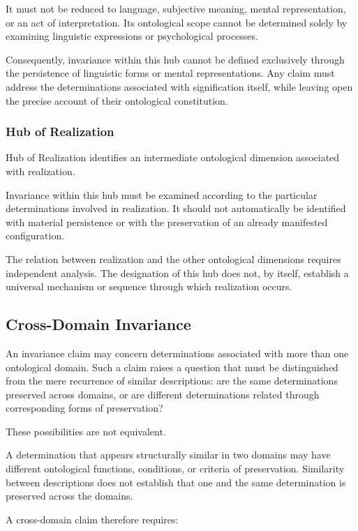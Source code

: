 It must not be reduced to language,
subjective meaning, mental representation,
or an act of interpretation. Its ontological
scope cannot be determined solely by
examining linguistic expressions or
psychological processes.

Consequently, invariance within this hub
cannot be defined exclusively through
the persistence of linguistic forms or
mental representations. Any claim must
address the determinations associated
with signification itself, while leaving
open the precise account of their
ontological constitution.

\subsubsection{Hub of Realization}

Hub of Realization identifies an intermediate
ontological dimension associated with
realization.

Invariance within this hub must be examined
according to the particular determinations
involved in realization. It should not
automatically be identified with material
persistence or with the preservation of
an already manifested configuration.

The relation between realization and
the other ontological dimensions requires
independent analysis. The designation
of this hub does not, by itself, establish
a universal mechanism or sequence through
which realization occurs.

\subsection{Cross-Domain Invariance}

An invariance claim may concern determinations
associated with more than one ontological domain.
Such a claim raises a question that must be
distinguished from the mere recurrence of
similar descriptions: are the same determinations
preserved across domains, or are different
determinations related through corresponding
forms of preservation?

These possibilities are not equivalent.

A determination that appears structurally
similar in two domains may have different
ontological functions, conditions, or criteria
of preservation. Similarity between descriptions
does not establish that one and the same
determination is preserved across the domains.

A cross-domain claim therefore requires:

